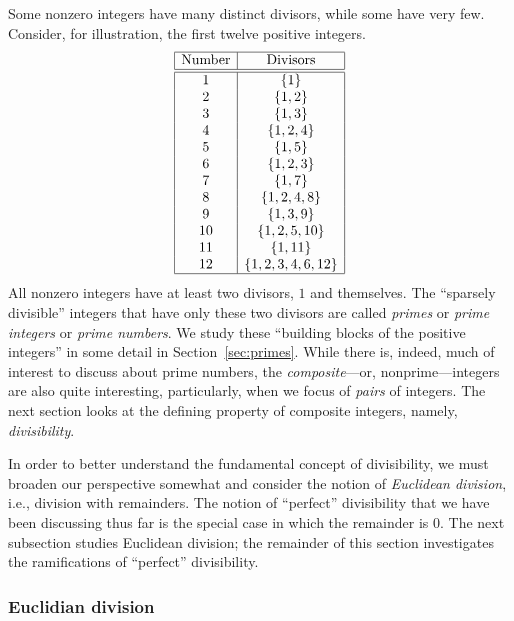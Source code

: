 Some nonzero integers have many distinct divisors, while some have
very few.  Consider, for illustration, the first twelve positive
integers.
\[ \begin{array}{|c|c|}
\hline
\mbox{Number} & \mbox{Divisors} \\
\hline
\hline
1  &  \{ 1 \} \\
2  &  \{ 1, 2 \} \\
3  &  \{ 1, 3 \} \\
4  &  \{ 1, 2, 4 \} \\
5  &  \{ 1, 5 \} \\
6  &  \{ 1, 2, 3 \} \\
7  &  \{ 1, 7 \} \\
8  &  \{ 1, 2, 4, 8 \} \\
9  &  \{ 1, 3, 9 \} \\
10  & \{ 1, 2, 5, 10 \} \\
11  & \{ 1, 11 \} \\
12  & \{ 1, 2, 3, 4, 6, 12 \} \\
\hline
\end{array}
\]
All nonzero integers have at least two divisors, $1$ and themselves.
The ``sparsely divisible'' integers that have only these two divisors
are called {\it primes} or {\it prime
  integers} or {\it prime numbers}.  We study these ``building blocks
of the positive integers'' in some detail in Section~\ref{sec:primes}.
While there is, indeed, much of interest to discuss about prime
numbers, the  {\it composite}---or,
nonprime---integers are also quite interesting, particularly, when we
focus of {\em pairs} of integers.  The next section looks at the
defining property of composite integers, namely, {\em divisibility}.

\smallskip

In order to better understand the fundamental concept of divisibility,
we must broaden our perspective somewhat and consider the notion of
{\em Euclidean division},  i.e., division
with remainders.  The notion of ``perfect'' divisibility that we have
been discussing thus far is the special case in which the remainder is
$0$.  The next subsection studies Euclidean division; the remainder of
this section investigates the ramifications of ``perfect''
divisibility.

\subsubsection{Euclidian division}
\label{sec:euclidian}

